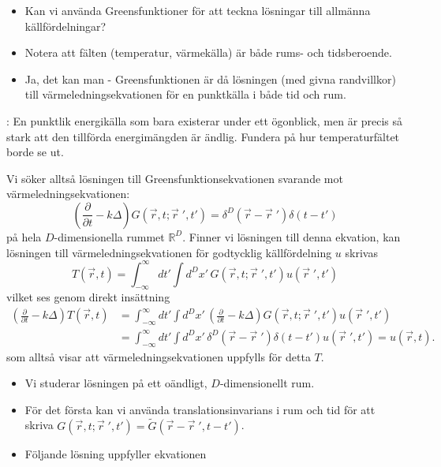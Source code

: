 \documentclass[%
oneside,                 %
final,                   %
10pt]{article}
\newcommand{\longinlinecomment}[3]{{\color{red}{\bf #1}: #2}}
\begin{document}
\begin{itemize}
\item Kan vi använda Greensfunktioner för att teckna lösningar till allmänna källfördelningar?

\item Notera att fälten (temperatur, värmekälla) är både rums- och tidsberoende.

\item Ja, det kan man - Greensfunktionen är då lösningen (med givna randvillkor) till värmeledningsekvationen för en punktkälla i både tid och rum.
\end{itemize}

\noindent
\longinlinecomment{Comment 5}{ En punktlik energikälla som bara existerar under ett ögonblick, men är precis så stark att den tillförda energimängden är ändlig. Fundera på hur temperaturfältet borde se ut. }{ En punktlik energikälla som }

Vi söker alltså lösningen till Greensfunktionsekvationen svarande mot värmeledningsekvationen:
$$   
\left(
\frac{\partial}{\partial t}-k\Delta\right)G(\vec{r},t;\vec{r}{\;}',t')
=\delta^D(\vec{r}-\vec{r}{\;}')\delta(t-t')
$$
på hela $D$-dimensionella rummet $\mathbb{R}^D$. 
Finner vi lösningen till denna ekvation, kan lösningen till värmeledningsekvationen för godtycklig källfördelning $u$ skrivas
$$
T(\vec{r},t)=\int_{-\infty}^\infty dt'\int d^Dx'\, G(\vec{r},t;\vec{r}{\;}',t')u(\vec{r}{\;}',t')
$$
vilket ses genom direkt insättning
\begin{align}
\left( \frac{\partial}{\partial t}-k\Delta\right)T(\vec{r},t)
&=\int_{-\infty}^\infty dt'\int d^Dx'\,
\left( \frac{\partial}{\partial t}-k\Delta\right)G(\vec{r},t;\vec{r}{\;}',t')u(\vec{r}{\;}',t')
\nonumber \\ 
&=\int_{-\infty}^\infty dt'\int d^Dx'\,
\delta^D(\vec{r}-\vec{r}{\;}')\delta(t-t')u(\vec{r}{\;}',t')
=u(\vec{r},t).
\end{align}
som alltså visar att värmeledningsekvationen uppfylls för detta $T$.

\begin{itemize}
\item Vi studerar lösningen på ett oändligt, $D$-dimensionellt rum. 

\item För det första kan vi använda translationsinvarians i rum och tid för att skriva $G(\vec{r},t;\vec{r}{\;}',t') = \tilde G(\vec{r}-\vec{r}{\;}',t-t')$.

\item Följande lösning uppfyller ekvationen
\end{itemize}
\end{document}
